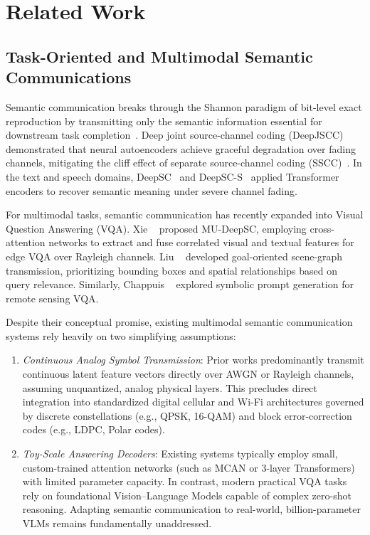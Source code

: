 \section{Related Work}\label{sec:related}

\subsection{Task-Oriented and Multimodal Semantic Communications}
Semantic communication breaks through the Shannon paradigm of bit-level exact reproduction by transmitting only the semantic information essential for downstream task completion~\cite{qin2021semantic,gunduz2023beyond}. Deep joint source-channel coding (DeepJSCC) demonstrated that neural autoencoders achieve graceful degradation over fading channels, mitigating the cliff effect of separate source-channel coding (SSCC)~\cite{bourtsoulatze2019djscc,kurka2020deepjsccf}. In the text and speech domains, DeepSC~\cite{xie2021deepsc} and DeepSC-S~\cite{weng2021semantic} applied Transformer encoders to recover semantic meaning under severe channel fading.

For multimodal tasks, semantic communication has recently expanded into Visual Question Answering (VQA). Xie \etal~\cite{xie2022mudeepscwcl,xie2021mudeepsc} proposed MU-DeepSC, employing cross-attention networks to extract and fuse correlated visual and textual features for edge VQA over Rayleigh channels. Liu \etal~\cite{liu2024gosg} developed goal-oriented scene-graph transmission, prioritizing bounding boxes and spatial relationships based on query relevance. Similarly, Chappuis \etal~\cite{chappuis2022promptrsvqa} explored symbolic prompt generation for remote sensing VQA.

Despite their conceptual promise, existing multimodal semantic communication systems rely heavily on two simplifying assumptions:
\begin{enumerate}
    \item \emph{Continuous Analog Symbol Transmission}: Prior works predominantly transmit continuous latent feature vectors directly over AWGN or Rayleigh channels, assuming unquantized, analog physical layers. This precludes direct integration into standardized digital cellular and Wi-Fi architectures governed by discrete constellations (e.g., QPSK, 16-QAM) and block error-correction codes (e.g., LDPC, Polar codes).
    \item \emph{Toy-Scale Answering Decoders}: Existing systems typically employ small, custom-trained attention networks (such as MCAN or 3-layer Transformers) with limited parameter capacity. In contrast, modern practical VQA tasks rely on foundational Vision--Language Models capable of complex zero-shot reasoning. Adapting semantic communication to real-world, billion-parameter VLMs remains fundamentally unaddressed.
\end{enumerate}

